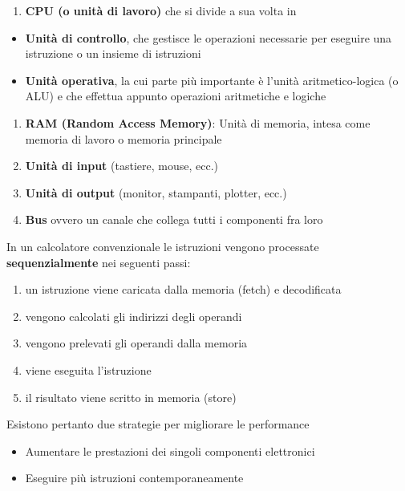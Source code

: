\begin{enumerate}
\def\labelenumi{\arabic{enumi}.}
\tightlist
\item
  \textbf{CPU (o unità di lavoro)} che si divide a sua volta in
\end{enumerate}

\begin{itemize}
\tightlist
\item
  \textbf{Unità di controllo}, che gestisce le operazioni necessarie per
  eseguire una istruzione o un insieme di istruzioni
\item
  \textbf{Unità operativa}, la cui parte più importante è l'unità
  aritmetico-logica (o ALU) e che effettua appunto operazioni
  aritmetiche e logiche
\end{itemize}

\begin{enumerate}
\def\labelenumi{\arabic{enumi}.}
\setcounter{enumi}{1}
\tightlist
\item
  \textbf{RAM (Random Access Memory)}: Unità di memoria, intesa come
  memoria di lavoro o memoria principale
\item
  \textbf{Unità di input} (tastiere, mouse, ecc.)
\item
  \textbf{Unità di output} (monitor, stampanti, plotter, ecc.)
\item
  \textbf{Bus} ovvero un canale che collega tutti i componenti fra loro
\end{enumerate}

In un calcolatore convenzionale le istruzioni vengono processate
\textbf{sequenzialmente} nei seguenti passi:

\begin{enumerate}
\def\labelenumi{\arabic{enumi}.}
\tightlist
\item
  un istruzione viene caricata dalla memoria (fetch) e decodificata
\item
  vengono calcolati gli indirizzi degli operandi
\item
  vengono prelevati gli operandi dalla memoria
\item
  viene eseguita l'istruzione
\item
  il risultato viene scritto in memoria (store)
\end{enumerate}

Esistono pertanto due strategie per migliorare le performance

\begin{itemize}
\tightlist
\item
  Aumentare le prestazioni dei singoli componenti elettronici
\item
  Eseguire più istruzioni contemporaneamente
\end{itemize}

